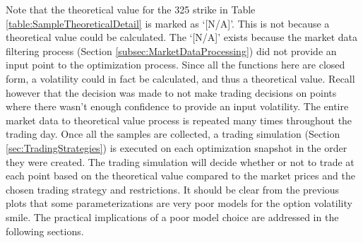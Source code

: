 \documentclass[12pt, a4paper, notitlepage]{article}
\numberwithin{equation}{subsection}
\numberwithin{figure}{subsection}
\numberwithin{table}{subsection}
\newcommand{\newpar}{\newline \newline}
\begin{document}
Note that the theoretical value for the 325 strike in Table \ref{table:SampleTheoreticalDetail} is marked as `[N/A]'.  This is not because a theoretical value could be calculated.  The `[N/A]' exists because the market data filtering process (Section \ref{subsec:MarketDataProcessing}) did not provide an input point to the optimization process.  Since all the functions here are closed form, a volatility could in fact be calculated, and thus a theoretical value.  Recall however that the decision was made to not make trading decisions on points where there wasn't enough confidence to provide an input volatility.
\newpar
The entire market data to theoretical value process is repeated many times throughout the trading day.  Once all the samples are collected, a trading simulation (Section \ref{sec:TradingStrategies}) is executed on each optimization snapshot in the order they were created.  The trading simulation will decide whether or not to trade at each point based on the theoretical value compared to the market prices and the chosen trading strategy and restrictions.
\newpar
It should be clear from the previous plots that some parameterizations are very poor models for the option volatility smile.  The practical implications of a poor model choice are addressed in the following sections.

\newpage
\end{document}
